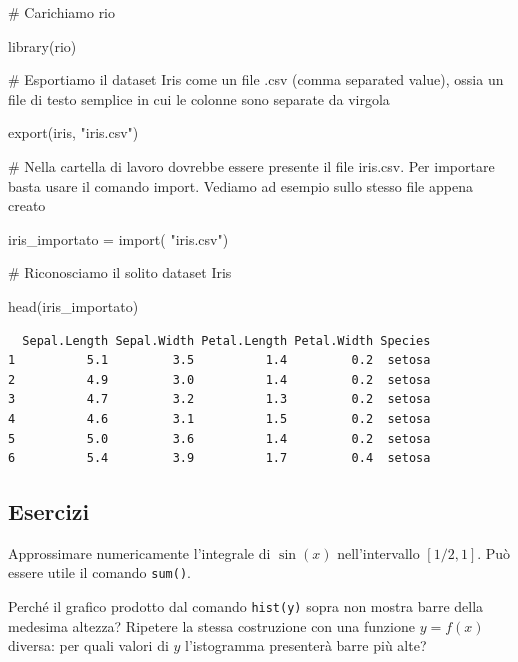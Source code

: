 \documentclass[
  italian,
  letterpaper,
]{book}
\newenvironment{Shaded}{\begin{snugshade}}{\end{snugshade}}
\newcommand{\CommentTok}[1]{\textcolor[rgb]{0.37,0.37,0.37}{#1}}
\newcommand{\FunctionTok}[1]{\textcolor[rgb]{0.28,0.35,0.67}{#1}}
\newcommand{\NormalTok}[1]{\textcolor[rgb]{0.00,0.23,0.31}{#1}}
\newcommand{\OtherTok}[1]{\textcolor[rgb]{0.00,0.23,0.31}{#1}}
\newcommand{\StringTok}[1]{\textcolor[rgb]{0.13,0.47,0.30}{#1}}
\theoremstyle{definition}
\theoremstyle{remark}
\begin{document}
\begin{Shaded}
\begin{Highlighting}[]
\CommentTok{\# Carichiamo rio}

\FunctionTok{library}\NormalTok{(}\StringTok{\textquotesingle{}rio\textquotesingle{}}\NormalTok{)}

\CommentTok{\# Esportiamo il dataset Iris come un file .csv (comma separated value), ossia un file di testo semplice in cui le colonne sono separate da virgola}

\FunctionTok{export}\NormalTok{(iris, }\StringTok{"iris.csv"}\NormalTok{)}

\CommentTok{\# Nella cartella di lavoro dovrebbe essere presente il file iris.csv. Per importare basta usare il comando import. Vediamo ad esempio sullo stesso file appena creato}

\NormalTok{iris\_importato }\OtherTok{=} \FunctionTok{import}\NormalTok{( }\StringTok{"iris.csv"}\NormalTok{)}

\CommentTok{\# Riconosciamo il solito dataset Iris}

\FunctionTok{head}\NormalTok{(iris\_importato)}
\end{Highlighting}
\end{Shaded}

\begin{verbatim}
  Sepal.Length Sepal.Width Petal.Length Petal.Width Species
1          5.1         3.5          1.4         0.2  setosa
2          4.9         3.0          1.4         0.2  setosa
3          4.7         3.2          1.3         0.2  setosa
4          4.6         3.1          1.5         0.2  setosa
5          5.0         3.6          1.4         0.2  setosa
6          5.4         3.9          1.7         0.4  setosa
\end{verbatim}

\subsection{Esercizi}\label{esercizi-40}

Approssimare numericamente l'integrale di \(\sin(x)\) nell'intervallo
\([1/2,1]\). Può essere utile il comando \texttt{sum()}.

Perché il grafico prodotto dal comando \texttt{hist(y)} sopra non mostra
barre della medesima altezza? Ripetere la stessa costruzione con una
funzione \(y= f(x)\) diversa: per quali valori di \(y\) l'istogramma
presenterà barre più alte?

\end{document}
